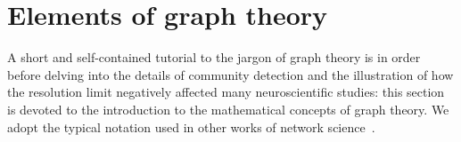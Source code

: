 
\section{Elements of graph theory}\label{sec:elementsofgraphtheory}
A short and self-contained tutorial to the jargon of graph theory is in order before delving into the details of community detection and the illustration of how the resolution limit negatively affected many neuroscientific studies: this section is devoted to the introduction to the mathematical concepts of graph theory. We adopt the typical notation used in other works of network science~\cite{newman2010book,estrada2011}.


